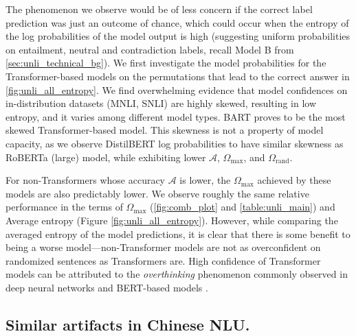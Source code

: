 \documentclass[letterpaper, 12pt]{report}
\begin{document}
The phenomenon we observe would be of less concern if the correct label prediction was just an outcome of chance, which could occur when the entropy of the log probabilities of the model output is high (suggesting uniform probabilities on entailment, neutral and contradiction labels, recall Model B from \autoref{sec:unli_technical_bg}). We first investigate the model probabilities for the Transformer-based models on the permutations that lead to the correct answer in \autoref{fig:unli_all_entropy}. We find overwhelming evidence that model confidences on in-distribution datasets (MNLI, SNLI) are highly skewed, resulting in low entropy, and it varies among different model types. BART proves to be the most skewed Transformer-based model. This skewness is not a property of model capacity, as we observe DistilBERT log probabilities to have similar skewness as RoBERTa (large) model, while exhibiting lower $\mathcal{A}$, $\Omega_{\text{max}}$, and $\Omega_{\text{rand}}$.



For non-Transformers whose accuracy $\mathcal{A}$ is lower, the $\Omega_{\text{max}}$ achieved by these models are also predictably lower. We observe roughly the same relative performance in the terms of $\Omega_{\text{max}}$ (\autoref{fig:comb_plot} and \autoref{table:unli_main}) and Average entropy (Figure \ref{fig:unli_all_entropy}). However, while comparing the averaged entropy of the model predictions, it is clear that there is some benefit to being a worse model---non-Transformer models are not as overconfident on randomized sentences as Transformers are.
High confidence of Transformer models can be attributed to the \textit{overthinking} phenomenon commonly observed in deep neural networks \cite{kaya2019shallowdeep} and BERT-based models \cite{zhou2020bert}.


\subsection{Similar artifacts in Chinese NLU.}
\label{sec:unli_ocnli_results}
\end{document}
